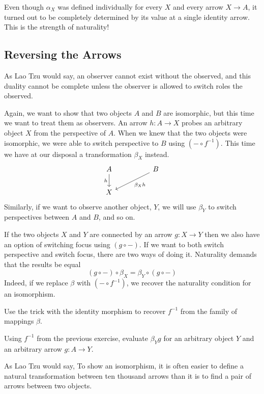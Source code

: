 \documentclass[DaoFP]{subfiles}
\begin{document}
Even though $\alpha_X$ was defined individually for every $X$ and every arrow $X \to A$, it turned out to be completely determined by its value at a single identity arrow. This is the strength of naturality!
\subsection{Reversing the Arrows}
As Lao Tzu would say, an observer cannot exist without the observed, and this duality cannot be complete unless the observer is allowed to switch roles the observed. 

Again, we want to show that two objects $A$ and $B$ are isomorphic, but this time we want to treat them as observers. An arrow $h \colon A \to X$ probes an arbitrary object $X$ from the perspective of $A$. When we knew that the two objects were isomorphic, we were able to switch perspective to $B$ using $(- \circ f^{-1})$. This time we have at our disposal a transformation $\beta_X$ instead.
\[
 \begin{tikzcd}
 A
 \arrow[d, "h"']
 && B
 \arrow[lld, "\beta_X h"]
 \\
 X
  \end{tikzcd}
\]
Similarly, if we want to observe another object, $Y$, we will use $\beta_Y$ to switch perspectives between $A$ and $B$, and so on. 

If the two objects $X$ and $Y$ are connected by an arrow $g \colon X \to Y$ then we also have an option of switching focus using $(g \circ -)$. If we want to both switch perspective and switch focus, there are two ways of doing it. Naturality demands that the results be equal
\[ (g \circ -) \circ \beta_X = \beta_Y \circ (g \circ -) \]
Indeed, if we replace $\beta$ with $(- \circ f^{-1})$, we recover the naturality condition for an isomorphism. 

\begin{exercise}
Use the trick with the identity morphism to recover $f^{-1}$ from the family of mappings $\beta$.
\end{exercise}
\begin{exercise}
Using $f^{-1}$ from the previous exercise, evaluate $\beta_Y g$ for an arbitrary object $Y$ and an arbitrary arrow $g \colon A \to Y$.
\end{exercise}


As Lao Tzu would say, To show an isomorphism, it is often easier to define a natural transformation between ten thousand arrows than it is to find a pair of arrows between two objects.
\end{document}
